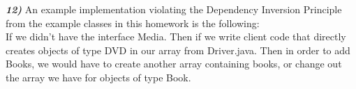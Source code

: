\documentclass[10pt,letterpaper]{article}
\begin{document}
\textbf{\textit{12)}}
An example implementation violating the Dependency Inversion Principle from the example classes in this homework is the following:\\
  If we didn't have the interface Media.  Then if we write client code that directly creates objects of type DVD in our array from Driver.java.  Then in order to add Books, we would have to create another array containing books, or change out the array we have for objects of type Book.\\
\end{document}
